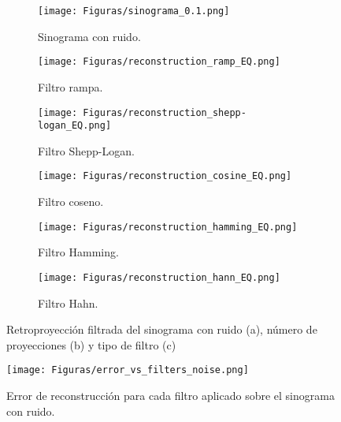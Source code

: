 \documentclass[letterpaper,12pt]{article}
\theoremstyle{plain}
\begin{document}
\begin{figure}[H]
   \centering
      \begin{subfigure}[h]{0.32\linewidth}
         \centering
         \texttt{[image: Figuras/sinograma\_0.1.png]}
         \caption{Sinograma con ruido.} 
         \label{fig:sinogram_0.1}
      \end{subfigure}
        \begin{subfigure}[h]{0.32\linewidth}
           \centering
           \texttt{[image: Figuras/reconstruction\_ramp\_EQ.png]}
           \caption{Filtro rampa.} 
           \label{fig:noise_ramp}
        \end{subfigure}
        \begin{subfigure}[h]{0.32\linewidth}
           \centering
           \texttt{[image: Figuras/reconstruction\_shepp-logan\_EQ.png]}
           \caption{Filtro Shepp-Logan.}
           \label{fig:noise_shepp}
        \end{subfigure}
        \begin{subfigure}[h]{0.32\linewidth}
            \centering
            \texttt{[image: Figuras/reconstruction\_cosine\_EQ.png]}
            \caption{Filtro coseno.}
         \label{fig:noise_coseno}
       \end{subfigure}
         \begin{subfigure}[h]{0.32\linewidth}
            \centering
            \texttt{[image: Figuras/reconstruction\_hamming\_EQ.png]}
            \caption{Filtro Hamming.}
            \label{fig:noise_hamming}
         \end{subfigure}
         \begin{subfigure}[h]{0.32\linewidth}
            \centering
            \texttt{[image: Figuras/reconstruction\_hann\_EQ.png]}
            \caption{Filtro Hahn.}
            \label{fig:noise_hahn}
      \end{subfigure}
   \caption{Retroproyección filtrada del sinograma con ruido (a), número de proyecciones (b) y tipo de filtro (c)}
   \label{fig:noise_vs_filters}
\end{figure}

\begin{figure}[H]
   \centering
         \texttt{[image: Figuras/error\_vs\_filters\_noise.png]}
   \caption{Error de reconstrucción para cada filtro aplicado sobre el sinograma con ruido.}
   \label{fig:filters_noise}
\end{figure}
\end{document}
